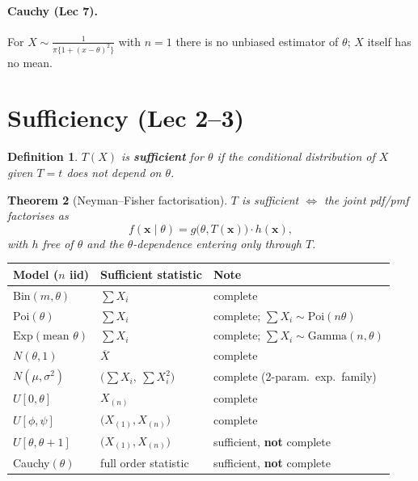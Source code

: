 \documentclass[11pt]{article}
\newtheorem{theorem}{Theorem}[section]
\newtheorem{definition}[theorem]{Definition}
\theoremstyle{remark}
\newcommand{\Xbar}{\overline{X}}
\begin{document}
\paragraph{Cauchy (Lec 7).} For $X\sim\frac{1}{\pi\{1+(x-\theta)^2\}}$ with $n=1$ there is no
unbiased estimator of $\theta$; $X$ itself has no mean.

\section{Sufficiency (Lec 2--3)}

\begin{definition}
$T(X)$ is \textbf{sufficient} for $\theta$ if the conditional distribution of $X$ given $T=t$
does not depend on $\theta$.
\end{definition}

\begin{theorem}[Neyman--Fisher factorisation]
$T$ is sufficient $\iff$ the joint pdf/pmf factorises as
\[
f(\mathbf{x}\mid\theta)=g\big(\theta,T(\mathbf{x})\big)\cdot h(\mathbf{x}),
\]
with $h$ free of $\theta$ and the $\theta$-dependence entering only through $T$.
\end{theorem}

\begin{center}
\renewcommand{\arraystretch}{1.2}
\begin{tabular}{@{}lll@{}}
\toprule
Model ($n$ iid) & Sufficient statistic & Note \\
\midrule
$\mathrm{Bin}(m,\theta)$ & $\sum X_i$ & complete \\
$\mathrm{Poi}(\theta)$ & $\sum X_i$ & complete; $\sum X_i\sim\mathrm{Poi}(n\theta)$ \\
$\mathrm{Exp}(\text{mean }\theta)$ & $\sum X_i$ & complete; $\sum X_i\sim\mathrm{Gamma}(n,\theta)$ \\
$N(\theta,1)$ & $\Xbar$ & complete \\
$N(\mu,\sigma^2)$ & $\big(\sum X_i,\ \sum X_i^2\big)$ & complete (2-param.\ exp.\ family) \\
$U[0,\theta]$ & $X_{(n)}$ & complete \\
$U[\phi,\psi]$ & $\big(X_{(1)},X_{(n)}\big)$ & complete \\
$U[\theta,\theta+1]$ & $\big(X_{(1)},X_{(n)}\big)$ & sufficient, \textbf{not} complete \\
Cauchy$(\theta)$ & full order statistic & sufficient, \textbf{not} complete \\
\bottomrule
\end{tabular}
\end{center}
\end{document}
